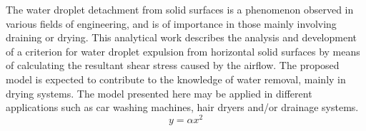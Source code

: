 The water droplet detachment from solid surfaces is a phenomenon observed in various fields of engineering, and is of importance in those mainly involving draining or drying. This analytical work describes the analysis and development of a criterion for water droplet expulsion from horizontal solid surfaces by means of calculating the resultant shear stress caused by the airflow. The proposed model is expected to contribute to the knowledge of water removal, mainly in drying systems. The model presented here may be applied in different applications such as car washing machines, hair dryers and/or drainage systems.
\[ y=\alpha x^2 \]